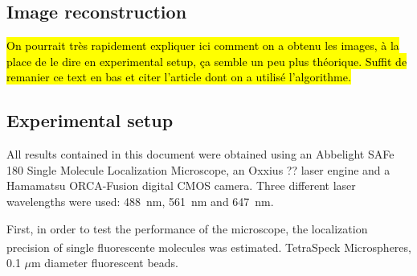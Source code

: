 \subsection{Image reconstruction}
\hl{On pourrait très rapidement expliquer ici comment on a obtenu les images, à la place de le dire en experimental setup, ça semble un peu plus théorique.
Suffit de remanier ce text en bas et citer l'article dont on a utilisé l'algorithme.}

\subsection{Experimental setup}
All results contained in this document were obtained using an Abbelight SAFe 180 Single Molecule Localization Microscope, an Oxxius ?? laser engine and a Hamamatsu ORCA-Fusion digital CMOS camera.
Three different laser wavelengths were used: \mbox{488 nm}, \mbox{561 nm} and \mbox{647 nm}.

First, in order to test the performance of the microscope, the localization precision of single fluorescente molecules was estimated.
TetraSpeck\textsuperscript{\texttrademark} Microspheres, 0.1 $\mu$m diameter fluorescent beads.


